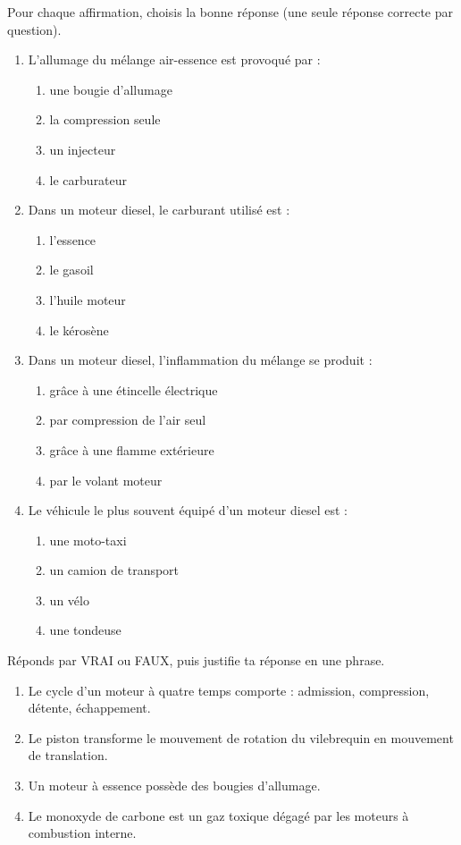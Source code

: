 \documentclass[11pt]{article}
\begin{document}
\begin{exercice}
Pour chaque affirmation, choisis la bonne réponse (une seule réponse correcte par question).
\begin{enumerate}
\item L'allumage du mélange air-essence est provoqué par :
\begin{enumerate}
\item une bougie d'allumage \item la compression seule \item un injecteur \item le carburateur
\end{enumerate}
\item Dans un moteur diesel, le carburant utilisé est :
\begin{enumerate}
\item l'essence \item le gasoil \item l'huile moteur \item le kérosène
\end{enumerate}
\item Dans un moteur diesel, l'inflammation du mélange se produit :
\begin{enumerate}
\item grâce à une étincelle électrique \item par compression de l'air seul \item grâce à une flamme extérieure \item par le volant moteur
\end{enumerate}
\item Le véhicule le plus souvent équipé d'un moteur diesel est :
\begin{enumerate}
\item une moto-taxi \item un camion de transport \item un vélo \item une tondeuse
\end{enumerate}
\end{enumerate}
\end{exercice}

\begin{exercice}
Réponds par VRAI ou FAUX, puis justifie ta réponse en une phrase.
\begin{enumerate}
\item Le cycle d'un moteur à quatre temps comporte : admission, compression, détente, échappement.
\item Le piston transforme le mouvement de rotation du vilebrequin en mouvement de translation.
\item Un moteur à essence possède des bougies d'allumage.
\item Le monoxyde de carbone est un gaz toxique dégagé par les moteurs à combustion interne.
\end{enumerate}
\end{exercice}
\end{document}

